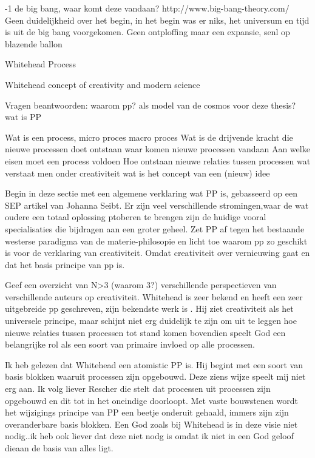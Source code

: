 \documentclass[a4paper]{Thesis}
\begin{document}
-1 de big bang, waar komt deze vandaan?
http://www.big-bang-theory.com/
Geen duidelijkheid over het begin, in het begin was er niks, het universum en tijd is uit de big bang voorgekomen.
Geen ontploffing maar een expansie, senl op blazende ballon

Whitehead
Process

Whitehead concept of creativity and modern science




Vragen beantwoorden:
waarom pp? als model van de cosmos voor deze thesis?
wat is PP

Wat is een process, micro proces macro proces
Wat is de drijvende kracht die nieuwe processen doet ontstaan
waar komen nieuwe processen vandaan
Aan welke eisen moet een process voldoen
Hoe ontstaan nieuwe relaties tussen processen
wat verstaat men onder creativiteit
wat is het concept van een (nieuw) idee

Begin in deze sectie met een algemene verklaring wat PP is, gebasseerd op een SEP artikel van Johanna Seibt. Er zijn veel verschillende stromingen,waar de wat oudere een totaal oplossing ptoberen te brengen zijn de huidige vooral specialisaties die bijdragen aan een groter geheel.
Zet PP af tegen het bestaande westerse paradigma van de materie-philosopie en licht toe waarom pp zo geschikt is voor de verklaring van creativiteit. Omdat creativiteit over vernieuwing gaat en dat het basis principe van pp is.

Geef een overzicht van N>3 (waarom 3?) verschillende perspectieven van verschillende auteurs op creativiteit. Whitehead is zeer bekend en heeft een zeer uitgebreide pp geschreven, zijn bekendste werk is \cite{whitehead1929process}. Hij ziet creativiteit als het universele principe, maar schijnt niet erg duidelijk te zijn om uit te leggen hoe nieuwe relaties tussen processen tot stand komen bovendien speelt God een belangrijke rol als een soort van primaire invloed op alle processen.

Ik heb gelezen dat Whitehead een atomistic PP is. Hij begint met een soort van basis blokken waaruit processen zijn opgebouwd. Deze ziens wijze speelt mij niet erg aan. Ik volg liever Rescher die stelt dat processen uit processen zijn opgebouwd en dit tot in het oneindige doorloopt. Met vaste bouwstenen wordt het wijzigings principe van PP een beetje onderuit gehaald, immers zijn zijn overanderbare basis blokken. Een God zoals bij Whitehead is in deze visie niet nodig..ik heb ook liever dat deze niet nodg is omdat ik niet in een God geloof dieaan de basis van alles ligt.
\end{document}

